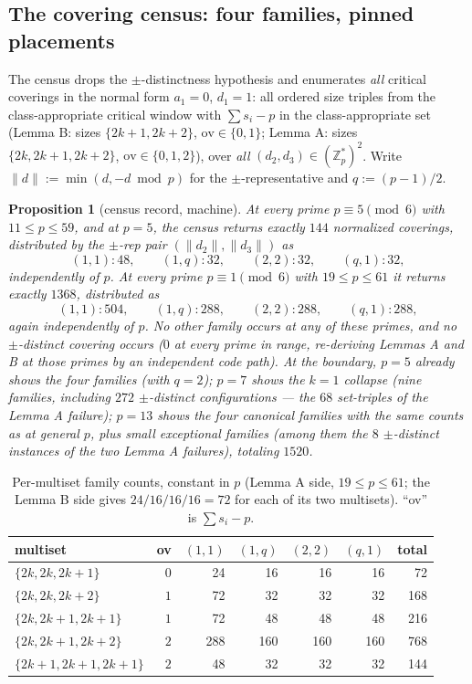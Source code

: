 \documentclass[11pt,a4paper]{article}
\numberwithin{equation}{section}
\theoremstyle{plain}
\theoremstyle{plain}
\newtheorem{proposition}[theorem]{Proposition}
\theoremstyle{definition}
\theoremstyle{remark}
\newcommand{\Z}{\mathbb{Z}}
\begin{document}
\subsection{The covering census: four families, pinned placements}
\label{sec:gt-census}

The census drops the $\pm$-distinctness hypothesis and enumerates
\emph{all} critical coverings in the normal form $a_1=0$, $d_1=1$: all
ordered size triples from the class-appropriate critical window with
$\sum s_i-p$ in the class-appropriate set (Lemma B: sizes
$\{2k{+}1,2k{+}2\}$, $\mathrm{ov}\in\{0,1\}$; Lemma A: sizes
$\{2k,2k{+}1,2k{+}2\}$, $\mathrm{ov}\in\{0,1,2\}$), over \emph{all}
$(d_2,d_3)\in(\Z_p^{*})^2$. Write $\|d\|:=\min(d,-d \bmod p)$ for the
$\pm$-representative and $q:=(p-1)/2$.

\begin{proposition}[census record, machine]\label{prop:census}
At every prime $p\equiv5\pmod 6$ with $11\le p\le 59$, and at $p=5$, the
census returns exactly $144$ normalized coverings, distributed by the
$\pm$-rep pair $(\|d_2\|,\|d_3\|)$ as
\[
(1,1):48,\qquad (1,q):32,\qquad (2,2):32,\qquad (q,1):32,
\]
independently of $p$. At every prime $p\equiv1\pmod 6$ with $19\le p\le 61$
it returns exactly $1368$, distributed as
\[
(1,1):504,\qquad (1,q):288,\qquad (2,2):288,\qquad (q,1):288,
\]
again independently of $p$. No other family occurs at any of these primes,
and no $\pm$-distinct covering occurs ($0$ at every prime in range,
re-deriving Lemmas A and B at those primes by an independent code path).
At the boundary, $p=5$ already shows the four families (with $q=2$); $p=7$
shows the $k=1$ collapse (nine families, including $272$ $\pm$-distinct
configurations --- the $68$ set-triples of the Lemma A failure); $p=13$
shows the four canonical families with the same counts as at general $p$,
plus small exceptional families (among them the $8$ $\pm$-distinct
instances of the two Lemma A failures), totaling $1520$.
\end{proposition}

\begin{table}[t]
\centering
\small
\caption{Per-multiset family counts, constant in $p$ (Lemma A side, $19\le
p\le 61$; the Lemma B side gives $24/16/16/16=72$ for each of its two
multisets). ``ov'' is $\sum s_i-p$.}
\label{tab:permultiset}
\begin{tabular}{@{}lrrrrrr@{}}
\toprule
multiset & ov & $(1,1)$ & $(1,q)$ & $(2,2)$ & $(q,1)$ & total \\
\midrule
$\{2k,2k,2k{+}1\}$ & $0$ & 24 & 16 & 16 & 16 & 72 \\
$\{2k,2k,2k{+}2\}$ & $1$ & 72 & 32 & 32 & 32 & 168 \\
$\{2k,2k{+}1,2k{+}1\}$ & $1$ & 72 & 48 & 48 & 48 & 216 \\
$\{2k,2k{+}1,2k{+}2\}$ & $2$ & 288 & 160 & 160 & 160 & 768 \\
$\{2k{+}1,2k{+}1,2k{+}1\}$ & $2$ & 48 & 32 & 32 & 32 & 144 \\
\bottomrule
\end{tabular}
\end{table}
\end{document}
